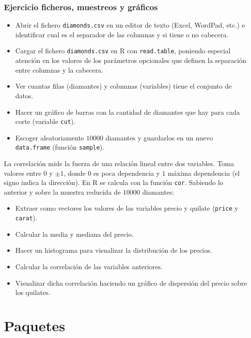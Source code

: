\documentclass{beamer}
\begin{document}
\begin{frame}[allowframebreaks]
\frametitle{Ejercicio ficheros, muestreos y gráficos}
\begin{itemize}
\item Abrir el fichero \texttt{diamonds.csv} en un editor de texto (Excel, WordPad, etc.) e identificar cual es el separador de las columnas y si tiene o no cabecera.
\item Cargar el fichero \texttt{diamonds.csv} en R con \texttt{read.table}, poniendo especial atención en los valores de los parámetros opcionales que definen la separación entre columnas y la cabecera.
\item Ver cuantas filas (diamantes) y columnas (variables) tiene el conjunto de datos.
\item Hacer un gráfico de barras con la cantidad de diamantes que hay para cada corte (variable \texttt{cut}).
\item Escoger aleatoriamente $10000$ diamantes y guardarlos en un nuevo \texttt{data.frame} (función \texttt{sample}).
\end{itemize}

La correlación mide la fuerza de una relación lineal entre dos variables. Toma valores entre $0$ y $\pm 1$, donde $0$ es poca dependencia y $1$ máxima dependencia (el signo indica la dirección). En R se calcula con la función \texttt{cor}. Sabiendo lo anterior y sobre la muestra reducida de $10000$ diamantes:

\begin{itemize}
\item Extraer como vectores los valores de las variables precio y quilate (\texttt{price} y \texttt{carat}).
\item Calcular la media y mediana del precio.
\item Hacer un histograma para visualizar la distribución de los precios.
\item Calcular la correlación de las variables anteriores.
\item Visualizar dicha correlación haciendo un gráfico de dispersión del precio sobre los quilates.
\end{itemize}
\end{frame}

\section{Paquetes}
\end{document}
